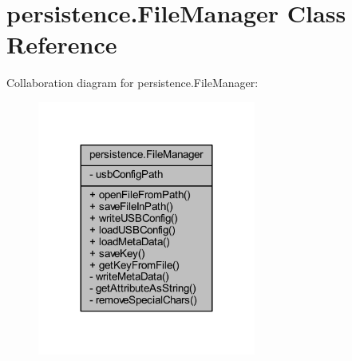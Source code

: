 \hypertarget{classpersistence_1_1_file_manager}{}\section{persistence.\+File\+Manager Class Reference}
\label{classpersistence_1_1_file_manager}


Collaboration diagram for persistence.\+File\+Manager\+:\nopagebreak
\begin{figure}[H]
\begin{center}
\leavevmode
\includegraphics[width=203pt]{classpersistence_1_1_file_manager__coll__graph}
\end{center}
\end{figure}
